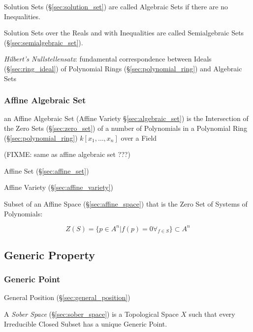 Solution Sets (\S\ref{sec:solution_set}) are called Algebraic Sets if there are
no Inequalities.

Solution Sets over the Reals and with Inequalities are called Semialgebraic
Sets (\S\ref{sec:semialgebraic_set}).

\emph{Hilbert's Nullstellensatz}: fundamental correspondence between Ideals
(\S\ref{sec:ring_ideal}) of Polynomial Rings (\S\ref{sec:polynomial_ring}) and
Algebraic Sets



\subsubsection{Affine Algebraic Set}\label{sec:affine_algebraic_set}

an Affine Algebraic Set (Affine Variety \S\ref{sec:algebraic_set}) is the
Intersection of the Zero Sets (\S\ref{sec:zero_set}) of a number of Polynomials
in a Polynomial Ring (\S\ref{sec:polynomial_ring}) $k[x_1,\ldots,x_n]$ over a
Field

(FIXME: same as affine algebraic set ???)


Affine Set (\S\ref{sec:affine_set})

Affine Variety (\S\ref{sec:affine_variety})

Subset of an Affine Space (\S\ref{sec:affine_space}) that is the Zero Set of
Systems of Polynomials:

\[
  Z(S) = \{ p \in A^n | f(p) = 0 \forall_{f \in S} \} \subset A^n
\]



\subsection{Generic Property}\label{sec:generic_property}

\subsubsection{Generic Point}\label{sec:generic_point}

\fist General Position (\S\ref{sec:general_position})

\fist A \emph{Sober Space} (\S\ref{sec:sober_space}) is a Topological Space $X$
such that every Irreducible Closed Subset has a unique Generic Point.



